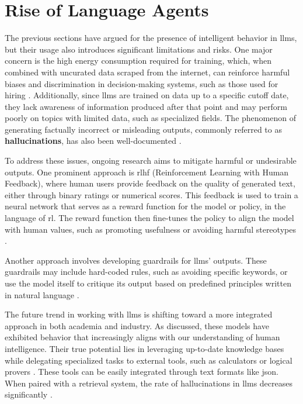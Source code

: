 \section{Rise of Language Agents}

The previous sections have argued for the presence of intelligent behavior in \glspl{llm}, but their usage also introduces significant limitations and risks. One major concern is the high energy consumption required for training, which, when combined with uncurated data scraped from the internet, can reinforce harmful biases and discrimination in decision-making systems, such as those used for hiring \cite{parrots}. Additionally, since \glspl{llm} are trained on data up to a specific cutoff date, they lack awareness of information produced after that point and may perform poorly on topics with limited data, such as specialized fields. The phenomenon of generating factually incorrect or misleading outputs, commonly referred to as \textbf{hallucinations}, has also been well-documented \cite{bai2024hallucination}.

\pskip

To address these issues, ongoing research aims to mitigate harmful or undesirable outputs. One prominent approach is \gls{rlhf} (Reinforcement Learning with Human Feedback), where human users provide feedback on the quality of generated text, either through binary ratings or numerical scores. This feedback is used to train a neural network that serves as a reward function for the model or policy, in the language of \gls{rl}. The reward function then fine-tunes the policy to align the model with human values, such as promoting usefulness or avoiding harmful stereotypes \cite{ouyang2022traininglanguagemodelsfollow}.

\pskip

Another approach involves developing guardrails for \glspl{llm}' outputs. These guardrails may include hard-coded rules, such as avoiding specific keywords, or use the model itself to critique its output based on predefined principles written in natural language \cite{dong2024buildingguardrailslargelanguage} \cite{yuan2024rigorllmresilientguardrailslarge}.

\pskip

The future trend in working with \glspl{llm} is shifting toward a more integrated approach in both academia and industry. As discussed, these models have exhibited behavior that increasingly aligns with our understanding of human intelligence. Their true potential lies in leveraging up-to-date knowledge bases while delegating specialized tasks to external tools, such as calculators or logical provers \cite{Trinh2024}. These tools can be easily integrated through text formats like \Gls{json}. When paired with a retrieval system, the rate of hallucinations in \glspl{llm} decreases significantly \cite{ding2024survey} \cite{wang2024evaluating}. 

